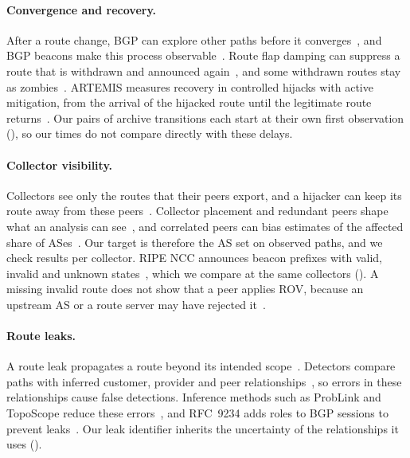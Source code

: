 \paragraph{Convergence and recovery.}
After a route change, BGP can explore other paths before it converges~\cite{labovitz2000delayed}, and BGP beacons make this process observable~\cite{mao2003convergence}.
Route flap damping can suppress a route that is withdrawn and announced again~\cite{mao2002damping}, and some withdrawn routes stay as zombies~\cite{fontugne2019zombies}.
ARTEMIS measures recovery in controlled hijacks with active mitigation, from the arrival of the hijacked route until the legitimate route returns~\cite{sermpezis2018artemis}.
Our pairs of archive transitions each start at their own first observation (), so our times do not compare directly with these delays.

\paragraph{Collector visibility.}
Collectors see only the routes that their peers export, and a hijacker can keep its route away from these peers~\cite{milolidakis2023}.
Collector placement and redundant peers shape what an analysis can see~\cite{zhang2007,alfroy2024mvp}, and correlated peers can bias estimates of the affected share of ASes~\cite{sermpezis2021impact}.
Our target is therefore the AS set on observed paths, and we check results per collector.
RIPE NCC announces beacon prefixes with valid, invalid and unknown states~\cite{ripe2011beacons}, which we compare at the same collectors ().
A missing invalid route does not show that a peer applies ROV, because an upstream AS or a route server may have rejected it~\cite{reuter2018rov,hlavacek2023rov}.

\paragraph{Route leaks.}
A route leak propagates a route beyond its intended scope~\cite{rfc7908}.
Detectors compare paths with inferred customer, provider and peer relationships~\cite{gao2001relationships,cloudflare2022leakdetection}, so errors in these relationships cause false detections.
Inference methods such as ProbLink and TopoScope reduce these errors~\cite{jin2019problink,jin2020toposcope}, and RFC~9234 adds roles to BGP sessions to prevent leaks~\cite{rfc9234}.
Our leak identifier inherits the uncertainty of the relationships it uses ().

